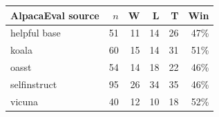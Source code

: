 \scriptsize
\begin{tabularx}{\linewidth}{@{}Xrrrrr@{}}
\toprule
AlpacaEval source & $n$ & W & L & T & Win \\
\midrule
helpful base & 51 & 11 & 14 & 26 & 47\% \\
koala & 60 & 15 & 14 & 31 & 51\% \\
oasst & 54 & 14 & 18 & 22 & 46\% \\
selfinstruct & 95 & 26 & 34 & 35 & 46\% \\
vicuna & 40 & 12 & 10 & 18 & 52\% \\
\bottomrule
\end{tabularx}
